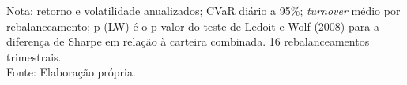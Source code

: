 \begin{table}[htbp]
\vspace{0.2cm}
\small Nota: retorno e volatilidade anualizados; CVaR diário a 95\%; \textit{turnover} médio por rebalanceamento; p (LW) é o p-valor do teste de Ledoit e Wolf (2008) para a diferença de Sharpe em relação à carteira combinada. 16 rebalanceamentos trimestrais.\\
Fonte: Elaboração própria.
\end{table}
